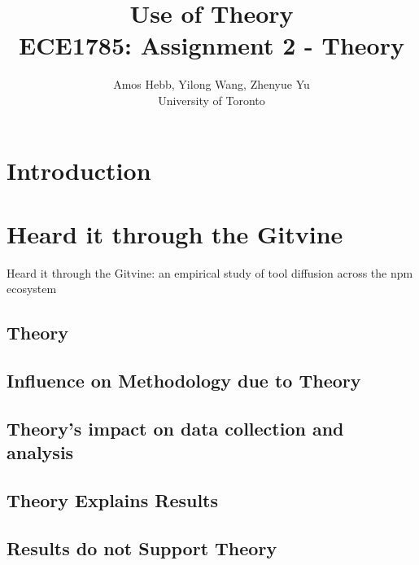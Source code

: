 \documentclass[12pt]{IEEEtran}
\begin{document}
\title{Use of Theory\\
{\normalsize ECE1785: Assignment 2 - Theory}}

\author{Amos Hebb, Yilong Wang, Zhenyue Yu\\ \small University of Toronto}

\maketitle






\section{Introduction}

\section{Heard it through the {\sc Git}vine}

Heard it through the {\sc Git}vine: an empirical study of tool diffusion across the npm ecosystem\cite{lamba2020heard}

\subsection{Theory}

\subsection{Influence on Methodology due to Theory}

\subsection{Theory's impact on data collection and analysis}

\subsection{Theory Explains Results}
\subsection{Results do not Support Theory} %
\end{document}

